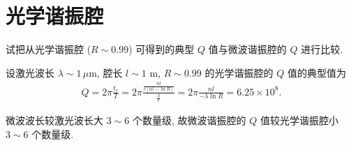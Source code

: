 \documentclass{note}
\begin{document}
\setcounter{chapter}{6}
\fi
\chapter{光学谐振腔}
\begin{exe}
    试把从光学谐振腔 ($R\sim 0.99$) 可得到的典型 $Q$ 值与微波谐振腔的 $Q$ 进行比较.
\end{exe}
\begin{pf}
    设激光波长 $\lambda\sim 1\,\mu$m, 腔长 $l\sim 1$ m, $R\sim 0.99$ 的光学谐振腔的 $Q$ 值的典型值为
    \begin{align}
        Q=2\pi\frac{t_c}{T}=2\pi\frac{\frac{nl}{c[\alpha l-\ln R]}}{\frac{\lambda}{c}}=2\pi\frac{nl}{-\lambda\ln R}=6.25\times 10^8.
    \end{align}

    微波波长较激光波长大 $3\sim 6$ 个数量级, 故微波谐振腔的 $Q$ 值较光学谐振腔小 $3\sim 6$ 个数量级.
\end{pf}
\end{document}
